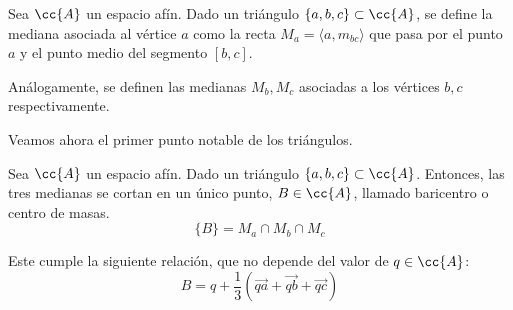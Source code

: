 \begin{definicion}[Mediana]
    Sea $\cc{A}$ un espacio afín. Dado un triángulo $\{a,b,c\}\subset \cc{A}$, se define la mediana asociada al vértice $a$ como la recta $M_a=\langle a,m_{bc}\rangle$ que pasa por el punto $a$ y el punto medio del segmento $[b,c]$.

    Análogamente, se definen las medianas $M_b, M_c$ asociadas a los vértices $b,c$ respectivamente.
\end{definicion}

Veamos ahora el primer punto notable de los triángulos.
\begin{teo}[Baricentro]\label{teo:baricentro}
    Sea $\cc{A}$ un espacio afín. Dado un triángulo $\{a,b,c\}\subset \cc{A}$. Entonces, las tres medianas se cortan en un único punto, $B\in \cc{A}$, llamado baricentro o centro de masas.
    \begin{equation*}
        \{B\}=M_a\cap M_b\cap M_c
    \end{equation*}

    Este cumple la siguiente relación, que no depende del valor de $q\in \cc{A}$:
    \begin{equation*}
        B=q + \frac{1}{3}\left(\vec{qa} + \vec{qb} + \vec{qc}\right)
    \end{equation*}

    \begin{figure}[H]
        \centering
\end{figure}
\end{teo}
